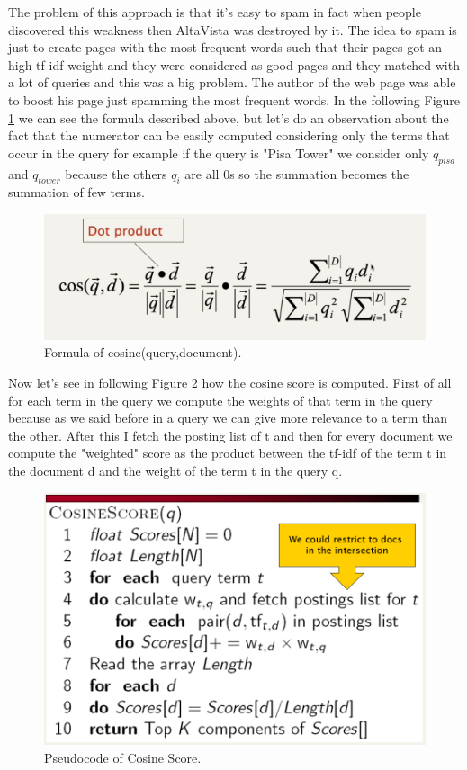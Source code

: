 The problem of this approach is that it's easy to spam in fact when people discovered this weakness then AltaVista was destroyed by it. The idea to spam is just to create pages with the most frequent words such that their pages got an high tf-idf weight and they were considered as good pages and they matched with a lot of queries and this was a big problem. The author of the web page was able to boost his page just spamming the most frequent words.\newline
In the following Figure \ref{fig:cosinequery} we can see the formula described above, but let's do an observation about the fact that the numerator can be easily computed considering only the terms that occur in the query for example if the query is "Pisa Tower" we consider only $q_{pisa}$ and $q_{tower}$ because the others $q_i$ are all 0s so the summation becomes the summation of few terms.\newline
\begin{figure}
    \centering
    \includegraphics[width=0.75\linewidth]{images/dotproduct.PNG}
    \caption{Formula of cosine(query,document).}
    \label{fig:cosinequery}
\end{figure}
Now let's see in following Figure \ref{fig:pseudocosine} how the cosine score is computed. First of all for each term in the query we compute the weights of that term in the query because as we said before in a query we can give more relevance to a term than the other. After this I fetch the posting list of t and then for every document we compute the "weighted" score as the product between the tf-idf of the term t in the document d and the weight of the term t in the query q.\newline
\begin{figure}
    \centering
    \includegraphics[width=0.75\linewidth]{images/cosinescore.PNG}
    \caption{Pseudocode of Cosine Score.}
    \label{fig:pseudocosine}
\end{figure}
